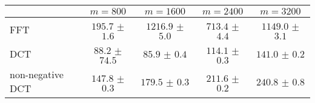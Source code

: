 \centering
\renewcommand{\arraystretch}{1.2}
\begin{tabular}{@{}lcccc@{}}
\toprule
 & $m=800$ & $m=1600$ & $m=2400$ & $m=3200$\\
\midrule
FFT & $195.7$ $\pm$ $1.6$ & $1216.9$ $\pm$ $5.0$ & $713.4$ $\pm$ $4.4$ & $1149.0$ $\pm$ $3.1$ \\
DCT & $88.2$ $\pm$ $74.5$ & $85.9$ $\pm$ $0.4$ & $114.1$ $\pm$ $0.3$ & $141.0$ $\pm$ $0.2$ \\
non-negative DCT & $147.8$ $\pm$ $0.3$ & $179.5$ $\pm$ $0.3$ & $211.6$ $\pm$ $0.2$ & $240.8$ $\pm$ $0.8$ \\
\bottomrule
\end{tabular}
